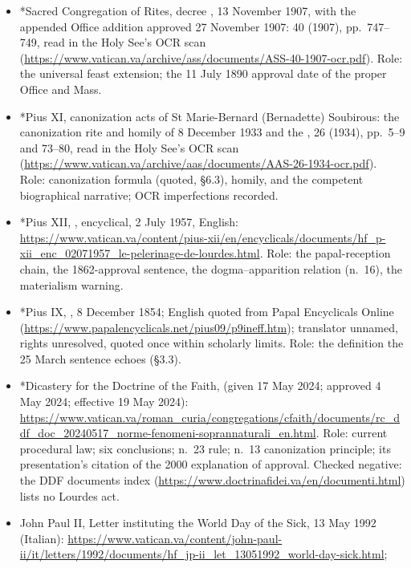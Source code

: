 \begin{itemize}
\item *Sacred Congregation of Rites, 
decree , 13 November 1907, with the
appended Office addition approved 27 November 1907:  40 (1907), pp.~747--749, read in the Holy See's
OCR scan
(\url{https://www.vatican.va/archive/ass/documents/ASS-40-1907-ocr.pdf}).
Role: the universal feast extension; the 11 July 1890 approval
date of the proper Office and Mass.
\item *Pius XI, canonization acts of St Marie-Bernard
(Bernadette) Soubirous: the canonization rite and homily of 8
December 1933 and the ,  26 (1934), pp.~5--9 and 73--80, read in the
Holy See's OCR scan
(\url{https://www.vatican.va/archive/aas/documents/AAS-26-1934-ocr.pdf}).
Role: canonization formula (quoted, \S6.3), homily, and the
competent biographical narrative; OCR imperfections recorded.
\item *Pius XII, , encyclical,
2 July 1957, English:
\url{https://www.vatican.va/content/pius-xii/en/encyclicals/documents/hf_p-xii_enc_02071957_le-pelerinage-de-lourdes.html}.
Role: the papal-reception chain, the 1862-approval sentence, the
dogma--apparition relation (n.~16), the materialism warning.
\item *Pius IX, , 8 December 1854;
English quoted from Papal Encyclicals Online
(\url{https://www.papalencyclicals.net/pius09/p9ineff.htm});
translator unnamed, rights unresolved, quoted once within
scholarly limits. Role: the definition the 25 March sentence
echoes (\S3.3).
\item *Dicastery for the Doctrine of the Faith, 
(given 17 May 2024; approved 4 May 2024; effective 19 May 2024):
\url{https://www.vatican.va/roman_curia/congregations/cfaith/documents/rc_ddf_doc_20240517_norme-fenomeni-soprannaturali_en.html}.
Role: current procedural law; six conclusions; n.~23 rule;
n.~13 canonization principle; its presentation's citation of the
2000 explanation of approval. Checked negative: the DDF
documents index
(\url{https://www.doctrinafidei.va/en/documenti.html}) lists no
Lourdes act.
\item John Paul II, Letter instituting the World Day of the
Sick, 13 May 1992 (Italian):
\url{https://www.vatican.va/content/john-paul-ii/it/letters/1992/documents/hf_jp-ii_let_13051992_world-day-sick.html};

\end{itemize}
